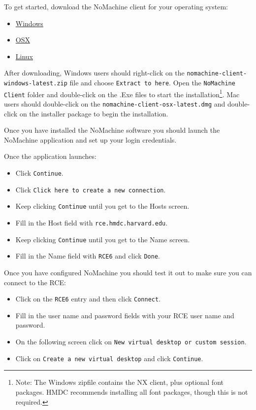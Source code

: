 \documentclass[11pt]{article}
\begin{document}
To get started, download the NoMachine client for your operating system: 
\begin{itemize}
\item \href{http://downloads.hmdc.harvard.edu/nx/4/nomachine-client-windows-latest.zip}{Windows}
\item \href{http://downloads.hmdc.harvard.edu/nx/4/nomachine-client-osx-latest.dmg}{OSX}
\item \href{http://downloads.hmdc.harvard.edu/nx/4/nomachine-client-linux-latest.zip}{Linux}
\end{itemize}

After downloading, Windows users should right-click on the \texttt{nomachine-client-windows-latest.zip} file and choose \texttt{Extract to here}. Open the \texttt{NoMachine Client} folder and double-click on the .Exe files to start the installation\footnote{Note: The Windows zipfile contains the NX client, plus optional font packages. HMDC recommends installing all font packages, though this is not required.}. Mac users should double-click on the \texttt{nomachine-client-osx-latest.dmg} and double-click on the installer package to begin the installation.

Once you have installed the NoMachine software you should launch the NoMachine application and set up your login credentials. 

Once the application launches:
\begin{itemize}
\item Click \texttt{Continue}.
\item Click \texttt{Click here to create a new connection}.
\item Keep clicking \texttt{Continue} until you get to the Hosts screen.
\item Fill in the Host field with \texttt{rce.hmdc.harvard.edu}.
\item Keep clicking \texttt{Continue} until you get to the Name screen.
\item Fill in the Name field with \texttt{RCE6} and click \texttt{Done}.
\end{itemize}

Once you have configured NoMachine you should test it out to make sure you can connect to the RCE: 
\begin{itemize}
\item Click on the \texttt{RCE6} entry and then click \texttt{Connect}.
\item Fill in the user name and password fields with your RCE user name and password.
\item On the following screen click on \texttt{New virtual desktop or custom session}.
\item Click on \texttt{Create a new virtual desktop} and click \texttt{Continue}.
\end{itemize}
\end{document}
